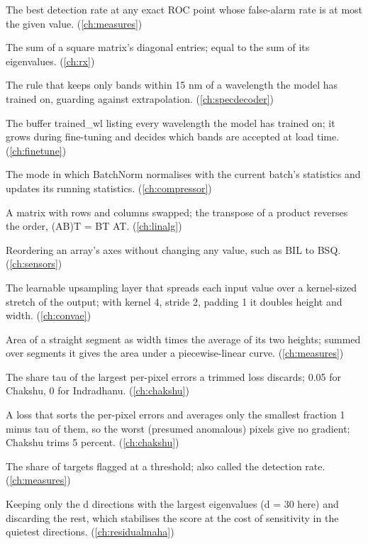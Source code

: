 \begin{description}[style=nextline,leftmargin=1.2em,font=\normalfont\bfseries]
\item[TPR at a fixed FPR] The best detection rate at any exact ROC point whose false-alarm rate is at most the given value. (\cref{ch:measures})
\item[Trace] The sum of a square matrix's diagonal entries; equal to the sum of its eigenvalues. (\cref{ch:rx})
\item[Trained-band mask] The rule that keeps only bands within 15 nm of a wavelength the model has trained on, guarding against extrapolation. (\cref{ch:specdecoder})
\item[Trained-wavelength record] The buffer trained\_wl listing every wavelength the model has trained on; it grows during fine-tuning and decides which bands are accepted at load time. (\cref{ch:finetune})
\item[Training mode] The mode in which BatchNorm normalises with the current batch's statistics and updates its running statistics. (\cref{ch:compressor})
\item[Transpose] A matrix with rows and columns swapped; the transpose of a product reverses the order, (AB)T = BT AT. (\cref{ch:linalg})
\item[Transpose (axes)] Reordering an array's axes without changing any value, such as BIL to BSQ. (\cref{ch:sensors})
\item[Transposed convolution] The learnable upsampling layer that spreads each input value over a kernel-sized stretch of the output; with kernel 4, stride 2, padding 1 it doubles height and width. (\cref{ch:convae})
\item[Trapezoid rule] Area of a straight segment as width times the average of its two heights; summed over segments it gives the area under a piecewise-linear curve. (\cref{ch:measures})
\item[Trim fraction] The share tau of the largest per-pixel errors a trimmed loss discards; 0.05 for Chakshu, 0 for Indradhanu. (\cref{ch:chakshu})
\item[Trimmed loss] A loss that sorts the per-pixel errors and averages only the smallest fraction 1 minus tau of them, so the worst (presumed anomalous) pixels give no gradient; Chakshu trims 5 percent. (\cref{ch:chakshu})
\item[True-positive rate (TPR)] The share of targets flagged at a threshold; also called the detection rate. (\cref{ch:measures})
\item[Truncation (PCA)] Keeping only the d directions with the largest eigenvalues (d = 30 here) and discarding the rest, which stabilises the score at the cost of sensitivity in the quietest directions. (\cref{ch:residualmaha})

\end{description}

